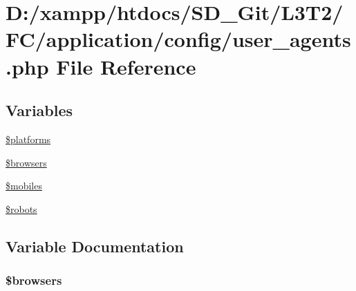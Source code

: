 \hypertarget{application_2config_2user__agents_8php}{}\section{D\+:/xampp/htdocs/\+S\+D\+\_\+\+Git/\+L3\+T2/\+F\+C/application/config/user\+\_\+agents.php File Reference}
\label{application_2config_2user__agents_8php}
\subsection*{Variables}
\begin{DoxyCompactItemize}
\item 
\hyperlink{application_2config_2user__agents_8php_a1c1a0a860242698ee6b3f4ef7d6eb343}{\$platforms}
\item 
\hyperlink{application_2config_2user__agents_8php_a81edf933083b5ac5b380385f59074a7d}{\$browsers}
\item 
\hyperlink{application_2config_2user__agents_8php_a6928dde5aa0be443766d5b2376de908a}{\$mobiles}
\item 
\hyperlink{application_2config_2user__agents_8php_a5752e2a66d1c03bc34666492746037ab}{\$robots}
\end{DoxyCompactItemize}


\subsection{Variable Documentation}
\hypertarget{application_2config_2user__agents_8php_a81edf933083b5ac5b380385f59074a7d}{}
\subsubsection[{\$browsers}]{\setlength{\rightskip}{0pt plus 5cm}\$browsers}\label{application_2config_2user__agents_8php_a81edf933083b5ac5b380385f59074a7d}
\hypertarget{application_2config_2user__agents_8php_a6928dde5aa0be443766d5b2376de908a}{}
